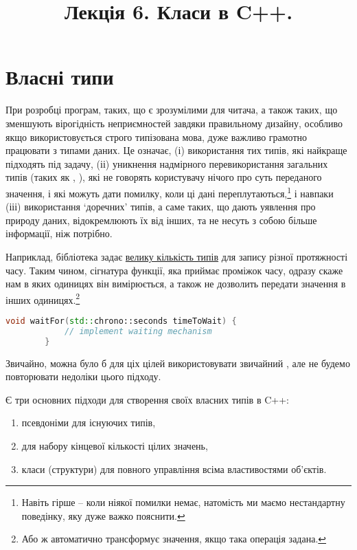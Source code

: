 \documentclass[12pt]{article}
\title{Лекція 6. Класи в C++.}
\begin{document}
	\maketitle

	\tableofcontents
	
	\section{Власні типи}
	При розробці програм, таких, що є зрозумілими для читача, а також таких, що зменшують вірогідність неприємностей завдяки правильному дизайну, особливо якщо використовується строго типізована мова, дуже важливо грамотно працювати з типами даних. Це означає, (і) використання тих типів, які найкраще підходять під задачу, (іі) уникнення надмірного перевикористання загальних типів (таких як , ), які не говорять користувачу нічого про суть переданого значення, і які можуть дати помилку, коли ці дані переплутаються,\footnote{Навіть гірше -- коли ніякої помилки немає, натомість ми маємо нестандартну поведінку, яку дуже важко пояснити.} і навпаки (ііі) використання `доречних' типів, а саме таких, що дають уявлення про природу даних, відокремлюють їх від інших, та не несуть з собою більше інформації, ніж потрібно.

	Наприклад, бібліотека  задає \href{https://en.cppreference.com/w/cpp/chrono/duration}{велику кількість типів} для запису різної протяжності часу. Таким чином, сігнатура функції, яка приймає проміжок часу, одразу скаже нам в яких одиницях він вимірюється, а також не дозволить передати значення в інших одиницях.\footnote{Або ж автоматично трансформує значення, якщо така операція задана.}

	\begin{lstlisting}[language=c++]
		void waitFor(std::chrono::seconds timeToWait) {
			// implement waiting mechanism
		}
	\end{lstlisting}

	Звичайно, можна було б для ціх цілей використовувати звичайний , але не будемо повторювати недоліки цього підходу.

	Є три основних підходи для створення своїх власних типів в C++:
	\begin{enumerate}
		\item псевдоніми для існуючих типів,
		\item {} для набору кінцевої кількості цілих значень,
		\item класи (структури) для повного управління всіма властивостями об'єктів.
	\end{enumerate}
\end{document}
